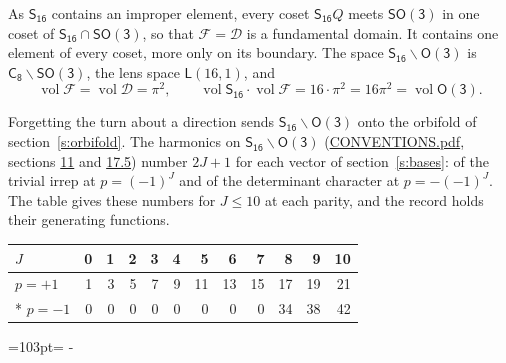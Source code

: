 \documentclass[10pt,a4paper]{article}
\newcommand{\needspace}[1]{\par\penalty-100\begingroup\dimen0=#1\relax\dimen2=\pagegoal
  \advance\dimen2-\pagetotal\ifdim\dimen0>\dimen2\relax\ifdim\dimen2>0pt\vfil\break\fi\fi
  \endgroup}
\numberwithin{equation}{section}
\newcommand{\grp}[1]{\mathsf{#1}}
\newcommand{\vol}{\operatorname{vol}}
\newcommand{\fcell}{\mathcal{D}}
\newcommand{\fdomain}{\mathcal{F}}
\newcommand{\lensspace}[2]{\mathsf{L}(#1, #2)}
\begin{document}
\leavevmode\label{n:set.fundamental}As $\grp{S_{16}}$ contains an improper element, every coset $\grp{S_{16}}Q$ meets \href{SO3.pdf}{$\grp{SO(3)}$} in one coset of $\grp{S_{16}} \cap \grp{SO(3)}$, so that $\fdomain = \fcell$ is a fundamental domain. It contains one element of every coset, more only on its boundary.
\leavevmode\label{n:set.lens}The space $\grp{S_{16}}\backslash\grp{O(3)}$ is $\grp{C_{8}}\backslash\grp{SO(3)}$, the lens space $\lensspace{16}{1}$, and
\begin{equation}\label{e:volume}\vol\fdomain = \vol\fcell = \pi^2,\qquad \vol\grp{S_{16}}\cdot\vol\fdomain = 16\cdot \pi^2 = 16\pi^2 = \vol\grp{O(3)}.\end{equation}

Forgetting the turn about a direction sends $\grp{S_{16}}\backslash\grp{O(3)}$ onto the orbifold of section~\ref{s:orbifold}.
The harmonics on $\grp{S_{16}}\backslash\grp{O(3)}$ (\href{../../CONVENTIONS.pdf}{CONVENTIONS.pdf}, sections \href{../../CONVENTIONS.pdf\#conv.11}{11} and \href{../../CONVENTIONS.pdf\#conv.17.5}{17.5}) number $2J + 1$ for each vector of section~\ref{s:bases}: of the trivial irrep at $p = (-1)^J$ and of the determinant character at $p = -(-1)^J$. The table gives these numbers for $J \le 10$ at each parity, and the record holds their generating functions.
{\small\setlength{\tabcolsep}{4pt}\begin{longtable}{@{}lrrrrrrrrrrr@{}}\toprule
$J$ & 0 & 1 & 2 & 3 & 4 & 5 & 6 & 7 & 8 & 9 & 10\\\midrule\endhead
\bottomrule\endfoot\endlastfoot
$p = +1$ & 1 & 3 & 5 & 7 & 9 & 11 & 13 & 15 & 17 & 19 & 21\\*
$p = -1$ & 0 & 0 & 0 & 0 & 0 & 0 & 0 & 0 & 34 & 38 & 42\\
\bottomrule\end{longtable}}
\needspace{103pt}
\end{document}

